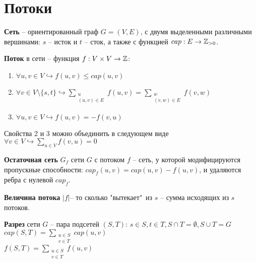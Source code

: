 \section{Потоки}%
\label{sec:Потоки}

\begin{Def}
	\textbf{Сеть} -- ориентированный граф $G = (V, E)$, с двумя выделенными различными вершинами: $s$ -- исток и  $t$ -- сток, а также с функцией $cap: E \rightarrow \mathbb{Z}_{>0}$.
\end{Def}

\begin{Def}
	\textbf{Поток} в сети -- функция $f: V \times V \rightarrow \mathbb{Z}$:
	
	\begin{enumerate}
		\item $\forall u, v \in V \hookrightarrow f(u, v) \leq cap(u, v)$
		\item $\forall v \in V \setminus \{s, t\} \hookrightarrow \sum\limits_{\substack{u \\ (u, v) \in E}} f(u, v) = \sum\limits_{\substack{w \\ (v, w) \in E}} f(v, w)$
		\item $\forall u, v \in V \hookrightarrow f(u, v) = -f(v, u)$
	\end{enumerate}

	\begin{note}
		Свойства 2 и 3 можно объединить в следующем виде $\forall v \in V \hookrightarrow \sum\limits_{u \in V} f(v, u) = 0$
	\end{note}
\end{Def}


\begin{Def}
	\textbf{Остаточная сеть} $G_f$ сети  $G$ с потоком $f$ -- сеть, у которой модифицируются пропускные способности:  $cap_f(u, v) = cap(u, v) - f(u, v)$, и удаляются ребра с нулевой  $cap_f$.
\end{Def}

\begin{Def}
	\textbf{Величина потока} $\lvert f \rvert$-- то сколько "вытекает"\ из $s$ -- сумма исходящих из  $s$ потоков.
\end{Def}

\begin{Def}
	\textbf{Разрез} сети $G$ -- пара подсетей $(S, T)$:  $s \in S, t \in T, S \cap T = \emptyset, S \cup T = G$ \\
	$cap(S, T) = \sum\limits_{\substack{u \in S \\ v \in T}} cap(u, v)$  \\
	$f(S, T) = \sum\limits_{\substack{u \in S \\ v \in T}} f(u, v)$ 
\end{Def}

